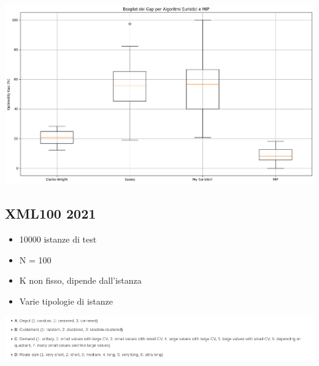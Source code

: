 \documentclass[compress]{beamer}
\begin{document}
\begin{frame}{\subsecname}
    \begin{center}
		\begin{minipage}{1\textwidth}
            \centering
            \includegraphics[width=1\linewidth]{images/boxplot_gap.png}
        \end{minipage}
    \end{center}
\end{frame}


\subsection{XML100 2021}

\begin{frame}{\subsecname}
    \begin{center}
        \begin{itemize}
            \item 10000 istanze di test
            \item N = 100
            \item K non fisso, dipende dall'istanza
            \item Varie tipologie di istanze
        \end{itemize}

        \begin{minipage}{0.9\textwidth}
            \centering
            \includegraphics[width=1\linewidth]{images/xml100_types.png}
        \end{minipage}
    \end{center}
\end{frame}
\end{document}
